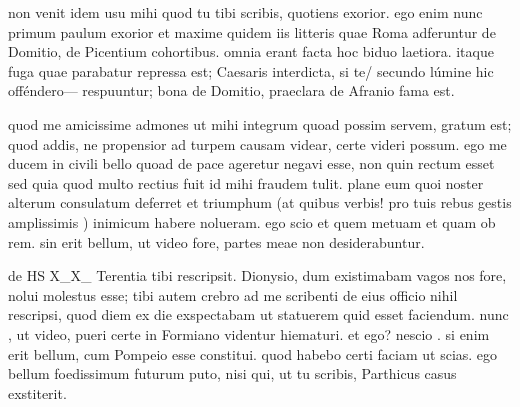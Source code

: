 


 non venit idem usu mihi quod tu tibi scribis, quotiens exorior. ego enim nunc primum paulum exorior et maxime quidem iis litteris quae Roma adferuntur de Domitio, de Picentium cohortibus. omnia erant facta hoc biduo laetiora. itaque fuga quae parabatur repressa est; Caesaris interdicta, si te/ secundo lúmine hic offéndero— respuuntur; bona de Domitio, praeclara de Afranio fama est.

 quod me amicissime admones ut mihi integrum quoad possim servem, gratum est; quod addis, ne propensior ad turpem causam videar, certe videri possum. ego me ducem in civili bello quoad de pace ageretur negavi esse, non quin rectum esset sed quia quod multo rectius fuit id mihi fraudem tulit. plane eum quoi noster alterum consulatum deferret et triumphum (at quibus verbis! pro tuis rebus gestis amplissimis ) inimicum habere nolueram. ego scio et quem metuam et quam ob rem. sin erit bellum, ut video fore, partes meae non desiderabuntur.

 de HS X_X_ Terentia tibi rescripsit. Dionysio, dum existimabam vagos nos fore, nolui molestus esse; tibi autem crebro ad me scribenti de eius officio nihil rescripsi, quod diem ex die exspectabam ut statuerem quid esset faciendum. nunc , ut video, pueri certe in Formiano videntur hiematuri. et ego? nescio . si enim erit bellum, cum Pompeio esse constitui. quod habebo certi faciam ut scias. ego bellum foedissimum futurum puto, nisi qui, ut tu scribis, Parthicus casus exstiterit.
